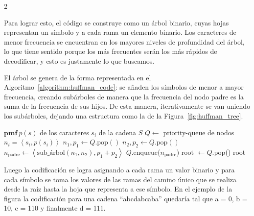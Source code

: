 \documentclass[a4paper, 10pt]{article}
\begin{document}
\begin{multicols}{2}
    \

    Para lograr esto, el código se construye como un árbol binario, cuyas hojas representan un símbolo y a cada rama un elemento binario. Los caracteres de menor frecuencia se encuentran en los mayores niveles de profundidad del árbol, lo que tiene sentido porque los más frecuentes serán los más rápidos de decodificar, y esto es justamente lo que buscamos.
    
    El árbol se genera de la forma representada en el Algoritmo~\ref{algorithm:huffman_code}: se añaden los símbolos de menor a mayor frecuencia, creando subárboles de manera que la frecuencia del nodo padre es la suma de la frecuencia de sus hijos. De esta manera, iterativamente se van uniendo los subárboles, dejando una estructura como la de la Figura~\ref{fig:huffman_tree}.

    \begin{algorithm}[H]
    \small
    \caption{HuffmanTree}
        \begin{algorithmic}[1]
            \Require$\mathbf{pmf} \ p(s)$ de los caracteres $s_i$ de la cadena $S$ 
            \State$Q\gets$ priority-queue de nodos $n_i = \left< s_i, p(s_i)\right>$
                \State$n_1, p_1 \gets Q\text{.pop}()$
                \State$n_2, p_2 \gets Q\text{.pop}()$
                \State$n_\text{padre} \gets  \left<\text{sub\_árbol}(n_1, n_2), p_1+p_2 \right>$
                \State$Q.$enqueue($n_\text{padre}$)
            \EndWhile
            \State root $\gets Q$.pop()
            \State\Return root
        \end{algorithmic}
        \label{algorithm:huffman_code}
    \end{algorithm}

    Luego la codificación se logra asignando a cada rama un valor binario y para cada símbolo se toma los valores de las ramas del camino único que se realiza desde la raíz hasta la hoja que representa a ese símbolo. En el ejemplo de la figura la codificación para una cadena ``abcdabcaba'' quedaría tal que a = 0, b = 10, c = 110 y finalmente d = 111.



\end{multicols}
\end{document}
